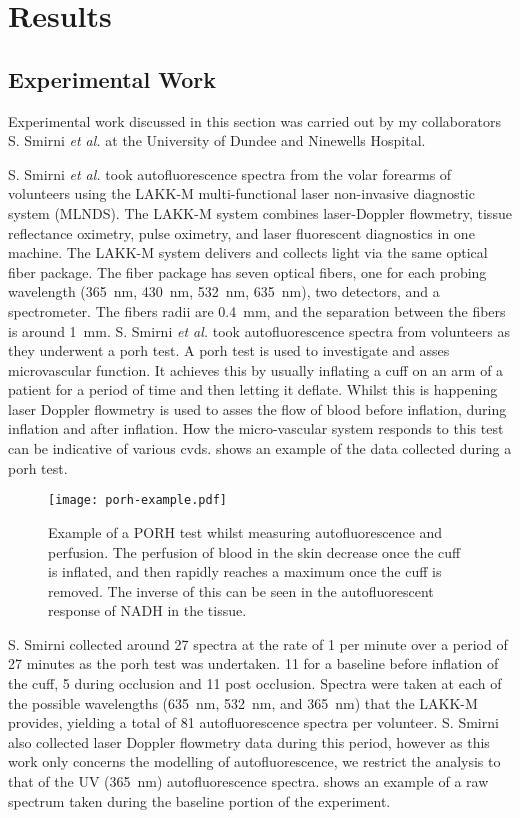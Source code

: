 \FloatBarrier
\section{Results}

\subsection*{Experimental Work}

Experimental work discussed in this section was carried out by my collaborators S. Smirni \textit{et al.} at the University of Dundee and Ninewells Hospital.

S. Smirni \textit{et al.} took autofluorescence spectra from the volar forearms of volunteers using the LAKK-M multi-functional laser non-invasive diagnostic system (MLNDS).
The LAKK-M system combines laser-Doppler flowmetry, tissue reflectance oximetry, pulse oximetry, and laser fluorescent diagnostics in one machine.
The LAKK-M system delivers and collects light via the same optical fiber package.
The fiber package has seven optical fibers, one for each probing wavelength (365~nm, 430~nm, 532~nm, 635~nm), two detectors, and a spectrometer.
The fibers radii are 0.4~mm, and the separation between the fibers is around 1~mm.
S. Smirni \textit{et al.} took autofluorescence spectra from volunteers as they underwent a \gls*{porh} test.
A \gls*{porh} test is used to investigate and asses microvascular function.
It achieves this by usually inflating a cuff on an arm of a patient for a period of time and then letting it deflate.
Whilst this is happening laser Doppler flowmetry is used to asses the flow of blood before inflation, during inflation and after inflation.
How the micro-vascular system responds to this test can be indicative of various \gls*{cvds}.
 shows an example of the data collected during a \gls*{porh} test.


\begin{figure}[!htpb]
  \centering
  \texttt{[image: porh-example.pdf]}
  \caption{Example of a PORH test whilst measuring autofluorescence and perfusion. The perfusion of blood in the skin decrease once the cuff is inflated, and then rapidly reaches a maximum once the cuff is removed. The inverse of this can be seen in the autofluorescent response of NADH in the tissue.}
  \label{fig:porh}
\end{figure}

S. Smirni collected around 27 spectra at the rate of 1 per minute over a period of 27 minutes as the \gls*{porh} test was undertaken.
11 for a baseline before inflation of the cuff, 5 during occlusion and 11 post occlusion.
Spectra were taken at each of the possible wavelengths (635~nm, 532~nm, and 365~nm) that the LAKK-M provides, yielding a total of 81 autofluorescence spectra per volunteer.
S. Smirni also collected laser Doppler flowmetry data during this period, however as this work only concerns the modelling of autofluorescence, we restrict the analysis to that of the UV (365~nm) autofluorescence spectra.
 shows an example of a raw spectrum taken during the baseline portion of the experiment.

